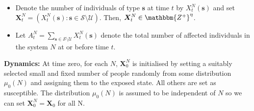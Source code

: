 \documentclass{article}
\theoremstyle{definition}
\begin{document}
\begin{itemize}
\item          
Denote the number of individuals of type $\bm{s}$ at time $t$ by  $X_t^N(\bm{s})$ and set 
$\bm{X}_t^N =( X_t^N(\bm{s}): \bm{s} \in  \mathcal S \setminus \mathcal U  )$. Then, ${\bm{X}_t^N \in \mathbbm{Z^+}^\eta}$.  
 \item
 Let $A_t^N = \sum_{\bm{s}\in\mathcal S \setminus \mathcal U  } X_t^N(\bm{s})$ denote the  total number of affected individuals in the 
 system $N$ at or before time $t$.
\end{itemize}
    

\noindent \textbf{Dynamics:} At time zero, for each $N$,  ${\bm{X}_0^N}$ is initialised by setting a suitably selected small and fixed  number of people 
randomly from some distribution $\mu_0(N)$ and assigning them 
 to the exposed state. All others  are set as susceptible. 
 The distribution $\mu_0(N)$ is assumed to be independent of $N$ so we can set ${\bm{X}_0^N} = \bm{X}_0$  for all N. 
 
\end{document}
